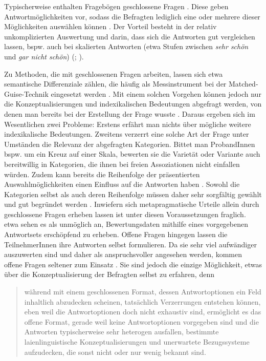 Typischerweise enthalten Fragebögen geschlossene Fragen \citep[s.][181]{Studler.2014}.
Diese geben Antwortmöglichkeiten vor, sodass die Befragten lediglich eine oder mehrere dieser Möglichkeiten auswählen können \citep[s.][55]{Porst2014}.
Der Vorteil besteht in der relativ unkomplizierten Auswertung und darin, dass sich die Antworten gut vergleichen lassen, bspw. auch bei skalierten Antworten (etwa Stufen zwischen \textit{sehr schön} und \textit{gar nicht schön}) (\citealp[s.][215]{Garrett.2004}; \citealp[74]{Adler.2018}). 

Zu Methoden, die mit geschlossenen Fragen arbeiten, lassen sich etwa semantische Differenziale zählen, die häufig als Messinstrument bei der Matched-Guise-Technik eingesetzt werden \citep[s.][13]{Hundt.1992}.
Mit einem solchen Vorgehen können jedoch nur die Konzeptualisierungen und indexikalischen Bedeutungen abgefragt werden, von denen man bereits bei der Erstellung der Frage wusste \citep[s.][196]{Garrett.2004}. 
Daraus ergeben sich im Wesentlichen zwei Probleme: Erstens erfährt man nichts über mögliche weitere indexikalische Bedeutungen. 
Zweitens verzerrt eine solche Art der Frage unter Umständen die Relevanz der abgefragten Kategorien.  
Bittet man ProbandInnen bspw. um ein Kreuz auf einer Skala, bewerten sie die Variet{\"a}t oder Variante auch bereitwillig in Kategorien, die ihnen bei freien Assoziationen nicht einfallen würden.  
Zudem kann bereits die Reihenfolge der präsentierten Auswahlmöglichkeiten einen Einfluss auf die Antworten haben \citep[s.][138]{Porst2014}. 
Sowohl die Kategorien selbst als auch deren Reihenfolge müssen daher sehr sorgfältig gewählt und gut begründet werden \citep[s.][70]{Adler.2018}.
Inwiefern sich metapragmatische Urteile allein durch geschlossene Fragen erheben lassen ist unter diesen Voraussetzungen fraglich.
\citet[216]{Garrett.2004} etwa sehen es als unmöglich an, Bewertungsdaten mithilfe eines vorgegebenen Antwortsets erschöpfend zu erheben. 
Offene Fragen hingegen lassen die TeilnehmerInnen ihre Antworten selbst formulieren. 
Da sie sehr viel aufwändiger auszuwerten sind und daher als anspruchsvoller angesehen werden, kommen offene Fragen seltener zum Einsatz \citep[s.][70--71]{Adler.2018}. 
Sie sind jedoch die einzige Möglichkeit, etwas über die Konzeptualisierung der Befragten selbst zu erfahren, denn
\begin{quote}während mit einem geschlossenen Format, dessen Antwortoptionen ein Feld inhaltlich abzudecken scheinen, tatsächlich Verzerrungen entstehen können, eben weil die Antwortoptionen doch nicht exhaustiv sind, ermöglicht es das offene Format, gerade weil keine Antwortoptionen vorgegeben sind und die Antworten typischerweise sehr heterogen ausfallen, bestimmte laienlinguistische Konzeptualisierungen und unerwartete Bezugssysteme aufzudecken, die sonst nicht oder nur wenig bekannt sind. \citep[71]{Adler.2018}\end{quote}
